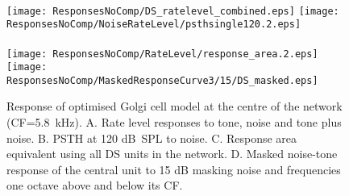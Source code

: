 \begin{figure}[htb]
{\hspace{0.5\textwidth}\hfill}\\
\texttt{[image: ResponsesNoComp/DS\_ratelevel\_combined.eps]}%
\texttt{[image: ResponsesNoComp/NoiseRateLevel/psthsingle120.2.eps]}\\ 
\hspace{0.5\textwidth}\hfill\\
\texttt{[image: ResponsesNoComp/RateLevel/response\_area.2.eps]}%
\texttt{[image: ResponsesNoComp/MaskedResponseCurve3/15/DS\_masked.eps]}\\
\caption[Optimised DS cell model responses]{Response of optimised Golgi cell model at the centre of the network (CF=5.8~kHz). 
A. Rate level responses to tone, noise and tone plus noise. 
B. PSTH at 120 dB~SPL to noise.  
C. Response area equivalent using all DS units in the network. 
D. Masked noise-tone response of the central unit to 15 dB masking noise and frequencies one octave above and below its CF\@.} 
\label{fig:DS_verification}
\end{figure}





